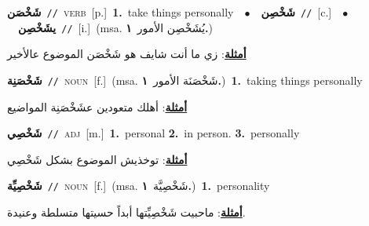 \documentclass[10pt,a4paper,twoside]{article} %
\begin{document}
\begin{multicols}{2}
{\setlength\topsep{0pt}\textbf{\foreignlanguage{arabic}{شَخْصَن}}\ {\color{gray}\texttt{//}\color{black}}\ \textsc{verb}\ [p.]\ \textbf{1.}~take things personally\ \ $\bullet$\ \ \setlength\topsep{0pt}\textbf{\foreignlanguage{arabic}{شَخْصِن}}\ {\color{gray}\texttt{//}\color{black}}\ [c.]\ \ $\bullet$\ \ \setlength\topsep{0pt}\textbf{\foreignlanguage{arabic}{يشَخْصِن}}\ {\color{gray}\texttt{//}\color{black}}\ [i.]\ \color{gray}(msa. \foreignlanguage{arabic}{يُشَخْصِن الأمور}~\foreignlanguage{arabic}{\textbf{١.}})\color{black}\  \begin{flushright}\color{gray}\foreignlanguage{arabic}{\textbf{\underline{\foreignlanguage{arabic}{أمثلة}}}: زي ما أنت شايف هو شَخْصَن الموضوع عالأخير}\end{flushright}\color{black}} \vspace{2mm}

{\setlength\topsep{0pt}\textbf{\foreignlanguage{arabic}{شَخْصَنِة}}\ {\color{gray}\texttt{//}\color{black}}\ \textsc{noun}\ [f.]\ \color{gray}(msa. \foreignlanguage{arabic}{شَخْصَنَة الأمور}~\foreignlanguage{arabic}{\textbf{١.}})\color{black}\ \textbf{1.}~taking things personally\  \begin{flushright}\color{gray}\foreignlanguage{arabic}{\textbf{\underline{\foreignlanguage{arabic}{أمثلة}}}: أهلك متعودين عشَخْصَنِة المواضيع}\end{flushright}\color{black}} \vspace{2mm}

{\setlength\topsep{0pt}\textbf{\foreignlanguage{arabic}{شَخْصِي}}\ {\color{gray}\texttt{//}\color{black}}\ \textsc{adj}\ [m.]\ \textbf{1.}~personal  \textbf{2.}~in person.  \textbf{3.}~personally\  \begin{flushright}\color{gray}\foreignlanguage{arabic}{\textbf{\underline{\foreignlanguage{arabic}{أمثلة}}}: توخذيش الموضوع بشكل شَخْصِي}\end{flushright}\color{black}} \vspace{2mm}

{\setlength\topsep{0pt}\textbf{\foreignlanguage{arabic}{شَخْصِيِّة}}\ {\color{gray}\texttt{//}\color{black}}\ \textsc{noun}\ [f.]\ \color{gray}(msa. \foreignlanguage{arabic}{شَخْصِيَّة}~\foreignlanguage{arabic}{\textbf{١.}})\color{black}\ \textbf{1.}~personality\  \begin{flushright}\color{gray}\foreignlanguage{arabic}{\textbf{\underline{\foreignlanguage{arabic}{أمثلة}}}: ماحبيت شَخْصِيِّتها أبداً حسيتها متسلطة وعنيدة.}\end{flushright}\color{black}} \vspace{2mm}


\end{multicols}
\end{document}
